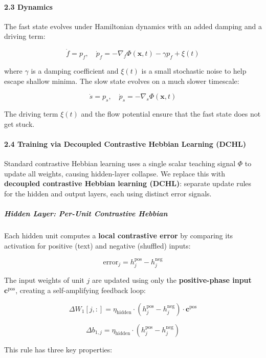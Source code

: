 \documentclass[
  11pt,
  a4paper,
]{article}
\begin{document}
\paragraph{2.3 Dynamics}\label{dynamics}

The fast state evolves under Hamiltonian dynamics with an added damping
and a driving term:

\[
\dot{f} = p_f, \quad \dot{p}_f = -\nabla_f \Phi(\mathbf{x}, t) - \gamma p_f + \xi(t)
\]

where \(\gamma\) is a damping coefficient and \(\xi(t)\) is a small
stochastic noise to help escape shallow minima. The slow state evolves
on a much slower timescale:

\[
\dot{s} = p_s, \quad \dot{p}_s = -\nabla_s \Phi(\mathbf{x}, t)
\]

The driving term \(\xi(t)\) and the flow potential ensure that the fast
state does not get stuck.

\paragraph{2.4 Training via Decoupled Contrastive Hebbian Learning
(DCHL)}\label{training-via-decoupled-contrastive-hebbian-learning-dchl}

Standard contrastive Hebbian learning uses a single scalar teaching
signal \(\Phi\) to update all weights, causing hidden-layer collapse. We
replace this with \textbf{decoupled contrastive Hebbian learning
(DCHL)}: separate update rules for the hidden and output layers, each
using distinct error signals.

\subparagraph{Hidden Layer: Per-Unit Contrastive
Hebbian}\label{hidden-layer-per-unit-contrastive-hebbian}

Each hidden unit computes a \textbf{local contrastive error} by
comparing its activation for positive (text) and negative (shuffled)
inputs:

\[
\text{error}_j = h_j^{\text{pos}} - h_j^{\text{neg}}
\]

The input weights of unit \(j\) are updated using only the
\textbf{positive-phase input} \(\mathbf{c}^{\text{pos}}\), creating a
self-amplifying feedback loop:

\[
\Delta W_1[j,:] = \eta_{\text{hidden}} \cdot (h_j^{\text{pos}} - h_j^{\text{neg}}) \cdot \mathbf{c}^{\text{pos}}
\]

\[
\Delta b_{1,j} = \eta_{\text{hidden}} \cdot (h_j^{\text{pos}} - h_j^{\text{neg}})
\]

This rule has three key properties:
\end{document}

